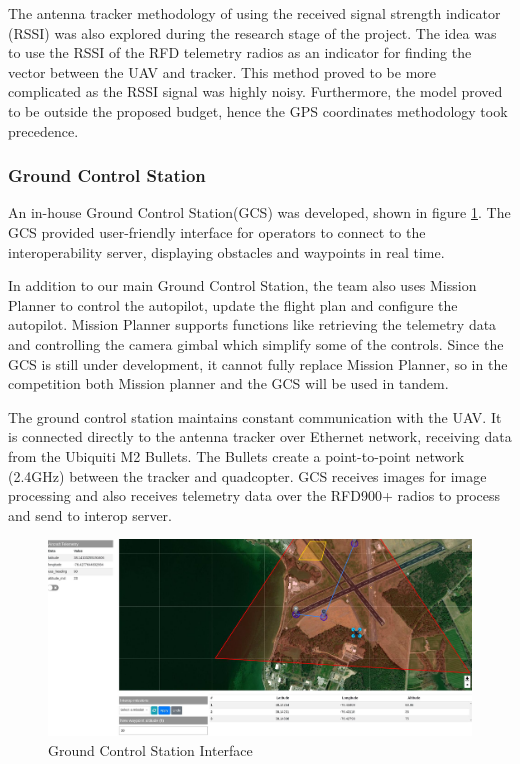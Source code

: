 The antenna tracker methodology of using the received signal strength indicator (RSSI) was also explored during the research stage of the project. The idea was to use the RSSI of the RFD telemetry radios as an indicator for finding the vector between the UAV and tracker. This method proved to be more complicated as the RSSI signal was highly noisy. Furthermore, the model proved to be outside the proposed budget, hence the GPS coordinates methodology took precedence. 


\subsubsection{Ground Control Station}
An in-house Ground Control Station(GCS) was developed, shown in figure \ref{fig:map_gui}. The GCS provided user-friendly interface for operators to connect to the interoperability server, displaying obstacles and waypoints in real time. 

In addition to our main Ground Control Station, the team also uses Mission Planner to control the autopilot, update the flight plan and configure the autopilot. Mission Planner supports functions like retrieving the telemetry data and controlling the camera gimbal which simplify some of the controls. Since the GCS is still under development, it cannot fully replace Mission Planner, so in the competition both Mission planner and the GCS will be used in tandem. 

The ground control station maintains constant communication with the UAV. It is connected directly to the antenna tracker over Ethernet network, receiving data from the Ubiquiti M2 Bullets. The Bullets create a point-to-point network (2.4GHz) between the tracker and quadcopter. GCS receives images for image processing and also receives telemetry data over the RFD900+ radios to process and send to interop server.  

\begin{figure}[ht]\centering
\includegraphics[width=\linewidth]{figures/map_gui.png}
\caption{Ground Control Station Interface}
\label{fig:map_gui}
\end{figure}


